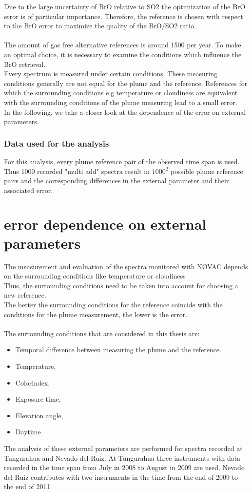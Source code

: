Due to the large uncertainty of BrO relative to SO2 the optimization of the BrO error is of particular importance. Therefore, the reference is chosen with respect to the BrO error to maximize the quality of the BrO/SO2 ratio. \\
\\
The amount of gas free alternative references is around 1500 per year. To make an optimal choice, it is necessary to examine the conditions which influence the BrO retrieval.\\
Every spectrum is measured under certain conditions. These measuring conditions generally are not equal for the plume and the reference. References for which the surrounding conditions e.g temperature or cloudiness are equivalent with the surrounding conditions of the  plume measuring lead to a small error.\\
In the following, we take a closer look at the dependence of the  error on external parameters. 
%
\subsubsection*{Data used for the analysis}
For this analysis, every plume reference pair of the observed time span is used. Thus 1000 recorded "multi add" spectra result in $1000^2$ possible plume reference pairs and the corresponding differences in the external parameter and their associated  error.


\section{ error dependence on external parameters \label{Chap:BROErr}}
The measurement and evaluation of the spectra monitored with NOVAC depends on the surrounding conditions like temperature or cloudiness \citep{lubcke2014optical}\\
Thus, the surrounding conditions need to be taken into account for choosing a new reference.\\
The better the surrounding conditions for the reference coincide with the conditions for the plume measurement, the lower is the  error. \\
	\\
The surrounding conditions that are considered in this thesis are: 
	\begin{itemize}
		\item Temporal difference between measuring the plume and the reference.
		\item Temperature, 
		\item Colorindex, 
		\item Exposure time, 
		\item Elevation angle, 
		\item Daytime 	
	\end{itemize}
The analysis of these external parameters are performed for spectra recorded at Tungurahua and Nevado del Ruiz. At Tungurahua three instruments with data recorded in the time span from July in 2008 to August in 2009 are used. Nevado del Ruiz contributes with two instruments in the time from the end of 2009 to the end of 2011.
%	
